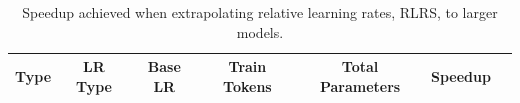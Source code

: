 \documentclass{article}
\theoremstyle{plain}
\theoremstyle{definition}
\theoremstyle{remark}
\begin{document}
    \begin{table}[h]
        \centering
        \caption{Speedup achieved when extrapolating relative learning rates, RLRS, to larger models.}
    \begin{tabular}{ccccccc}
    \toprule
    
    
    
    Type & LR Type & Base LR & Train Tokens & Total Parameters &  Speedup \\ \midrule
    

\end{tabular}
\end{table}
\end{document}
